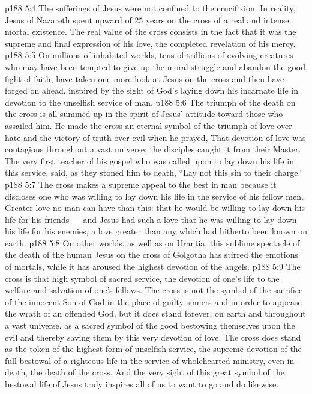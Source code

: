 \vs p188 5:4 \pc The sufferings of Jesus were not confined to the crucifixion. In reality, Jesus of Nazareth spent upward of 25 years on the cross of a real and intense mortal existence. The real value of the cross consists in the fact that it was the supreme and final expression of his love, the completed revelation of his mercy.
\vs p188 5:5 \pc On millions of inhabited worlds, tens of trillions of evolving creatures who may have been tempted to give up the moral struggle and abandon the good fight of faith, have taken one more look at Jesus on the cross and then have forged on ahead, inspired by the sight of God’s laying down his incarnate life in devotion to the unselfish service of man.
\vs p188 5:6 The triumph of the death on the cross is all summed up in the spirit of Jesus’ attitude toward those who assailed him. He made the cross an eternal symbol of the triumph of love over hate and the victory of truth over evil when he prayed,  That devotion of love was contagious throughout a vast universe; the disciples caught it from their Master. The very first teacher of his gospel who was called upon to lay down his life in this service, said, as they stoned him to death, “Lay not this sin to their charge.”
\vs p188 5:7 The cross makes a supreme appeal to the best in man because it discloses one who was willing to lay down his life in the service of his fellow men. Greater love no man can have than this: that he would be willing to lay down his life for his friends --- and Jesus had such a love that he was willing to lay down his life for his enemies, a love greater than any which had hitherto been known on earth.
\vs p188 5:8 On other worlds, as well as on Urantia, this sublime spectacle of the death of the human Jesus on the cross of Golgotha has stirred the emotions of mortals, while it has aroused the highest devotion of the angels.
\vs p188 5:9 \pc The cross is that high symbol of sacred service, the devotion of one’s life to the welfare and salvation of one’s fellows. The cross is not the symbol of the sacrifice of the innocent Son of God in the place of guilty sinners and in order to appease the wrath of an offended God, but it does stand forever, on earth and throughout a vast universe, as a sacred symbol of the good bestowing themselves upon the evil and thereby saving them by this very devotion of love. The cross does stand as the token of the highest form of unselfish service, the supreme devotion of the full bestowal of a righteous life in the service of wholehearted ministry, even in death, the death of the cross. And the very sight of this great symbol of the bestowal life of Jesus truly inspires all of us to want to go and do likewise.
